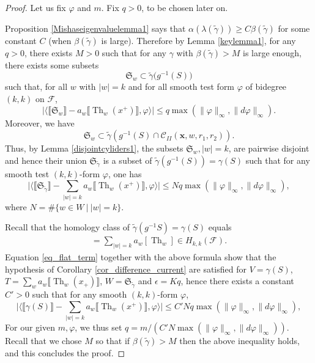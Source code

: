 \documentclass[12pt]{amsbook}%
\theoremstyle{definition}
\theoremstyle{remark}
\numberwithin{section}{chapter}
\numberwithin{subsection}{section}
\numberwithin{figure}{chapter}
\DeclareMathOperator{\Th}{Th}
\newcommand\intcur[1]{\llbracket #1 \rrbracket}
\def\cF{{\mathscr{F}}}
\def\fS{{\mathfrak{S}}}
\def\tga{{\tilde{\gamma}}}
\def\Cylii{{\mathcal{C}_{II}}}
\def\bx{\mathbf{x}}
\def\ga{\gamma}
\def\la{\lambda}
\begin{document}
{{\begin{proof}
Let us fix $\varphi$ and $m$. Fix $q>0$, to be chosen later on.

Proposition \ref{Mishaseigenvaluelemma1}  says that $\alpha(\la(\tilde{\gamma}))\geqslant C\beta(\tga)$ for some constant $C$ (when $\beta(\tga)$ is large). Therefore by Lemma \ref{keylemma1}, for any $q >0$, there exists $M>0$ such that  for any $\gamma$ with $\beta(\tga)> M$ is large enough, there exists some  subsets
\[
\fS_w\subset\tga\big(g^{-1}(S)\big)
\]
such that, for all $w$ with $\lvert w \rvert=k$ and for all smooth test form $\varphi$ of bidegree $(k,k)$ on $\cF$, 
\begin{equation*}\label{eq:constant_m1}
\big\lvert\langle \llbracket \fS_{w}\rrbracket - a_w\llbracket \Th_{w}(x^+)\rrbracket , \varphi \rangle \big\rvert \leqslant q \max ( \lVert \varphi \rVert_\infty , \lVert d\varphi \rVert_\infty ).
\end{equation*}
Moreover, we have 
\[
\fS_{w}\subset \tga\left(g^{-1}(S)\cap \Cylii(\bx,w,r_1,r_2)\right).
\]
Thus, by Lemma \ref{disjointcyliders1}, the subsets $\fS_w,\lvert w\rvert=k$, are pairwise disjoint and hence their union $\fS_\tga$ is a subset of $\tga(g^{-1}(S))=\ga(S)$ such that for any smooth test $(k,k)$-form $\varphi$, one has 
\begin{equation} \label{eq_flat_term}
\vert\langle \llbracket\fS_\tga \rrbracket- \sum_{\vert w\vert=k}a_w\llbracket \Th_{w}(x^+)\rrbracket, \varphi \rangle \vert\leqslant N q \max ( \lVert \varphi \rVert_\infty , \lVert d\varphi \rVert_\infty ), 
\end{equation}
where $ N = \# \{ w \in W \ | \ |w|=k \}$.

Recall that the homology class of $\tga(g^{-1}S)=\ga(S)$ equals 
\begin{align*}
[\ga(S)]=\sum_{\vert w\vert=k}a_w[\Th_w] \in H_{k,k}(\cF).
\end{align*}
Equation  \eqref{eq_flat_term} together with the above formula show that the hypothesis  of Corollary \ref{cor_difference_current} are satisfied for  $V =\ga(S)$, $T = \sum_{w} a_w \intcur{\Th_w(x_+)}$, $W = \fS_{\tilde{\gamma}}$ and $\epsilon = K q$, hence there exists a constant $C' > 0$ such that for any smooth $(k,k)$-form $\varphi$, 
\[
\vert\langle \llbracket\ga(S)\rrbracket - \sum_{\vert w\vert=k}a_w\llbracket \Th_{w}(x^+)\rrbracket , \varphi \rangle \vert \leqslant C' N q  \max( \lVert \varphi \rVert_\infty , \lVert d\varphi \rVert_\infty  ), 
\]
 For our given $m, \varphi$, we thus set $q = m/(C' N \max (\lVert \varphi \rVert_\infty , \lVert d\varphi \rVert_\infty )) $. Recall that we chose $M$ so that if $\beta(\tilde{\gamma})>M$ then the above inequality holds, and this  concludes the proof.
\end{proof}


}}
\end{document}
